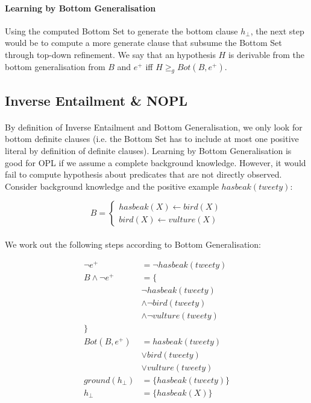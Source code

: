 \documentclass{article}
\theoremstyle{plain}
\theoremstyle{definition}
\begin{document}
\begin{multicols}{2}
\paragraph{Learning by Bottom Generalisation} Using the computed Bottom Set to generate the bottom clause $h_{\perp}$, the next step would be to compute a more generate clause that subsume the Bottom Set through top-down refinement. We say that an hypothesis $H$ is derivable from the bottom generalisation from $B$ and $e^+$ iff $H \geq_g Bot(B, e^+)$. 

\subsection{Inverse Entailment \& NOPL}

\paragraph{} By definition of Inverse Entailment and Bottom Generalisation, we only look for bottom definite clauses (i.e. the Bottom Set has to include at most one positive literal by definition of definite clauses). Learning by Bottom Generalisation is good for OPL if we assume a complete background knowledge. However, it would fail to compute hypothesis about predicates that are not directly observed. Consider background knowledge and the positive example $hasbeak(tweety)$:

\[
B = \begin{cases}
hasbeak(X) \leftarrow bird(X)\\
bird(X) \leftarrow vulture(X)
\end{cases}
\]

\paragraph{} We work out the following steps according to Bottom Generalisation:

\begin{align*}
\lnot e^+ &= \lnot hasbeak(tweety)\\
B \land \lnot e^+ &= \{\\
& \lnot hasbeak(tweety)\\
& \land \lnot bird(tweety) \\
& \land \lnot vulture(tweety)\\
\}&\\
Bot(B, e^+) &= hasbeak(tweety)\\
& \lor bird(tweety)\\
& \lor vulture(tweety)\\
ground(h_{\perp}) &= \{ hasbeak(tweety) \}\\
h_{\perp} &= \{ hasbeak(X) \}
\end{align*}


\end{multicols}
\end{document}
